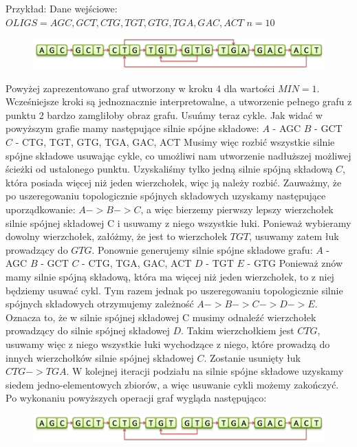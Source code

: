 \documentclass[a4paper,10pt]{article}
\begin{document}
Przykład:
Dane wejściowe:
$OLIGS = { AGC, GCT, CTG, TGT, GTG, TGA, GAC, ACT }$
$n = 10$

\begin{figure}[h]
  \footnotesize\centering
  \includegraphics[width=\textwidth,keepaspectratio]{Graph1.png}
\end{figure}

Powyżej zaprezentowano graf utworzony w kroku 4 dla wartości $MIN=1$. Wcześniejsze kroki są jednoznacznie interpretowalne, a utworzenie pełnego grafu z punktu 2 bardzo zamgliłoby obraz grafu. Usuńmy teraz cykle.
Jak widać w powyższym grafie mamy następujące silnie spójne składowe:
$A$ - {AGC}
$B$ - {GCT}
$C$ - {CTG, TGT, GTG, TGA, GAC, ACT}
Musimy więc rozbić wszystkie silnie spójne składowe usuwając cykle, co umożliwi nam utworzenie nadłuższej możliwej ścieżki od ustalonego punktu.
Uzyskaliśmy tylko jedną silnie spójną składową $C$, która posiada więcej niż jeden wierzchołek, więc ją należy rozbić. Zauważmy, że po uszeregowaniu topologicznie spójnych składowych uzyskamy następujące uporządkowanie: $A->B->C$, a więc bierzemy pierwszy lepszy wierzchołek silnie spójnej składowej C i usuwamy z niego wszystkie łuki. Ponieważ wybieramy dowolny wierzchołek, załóżmy, że jest to wierzchołek $TGT$, usuwamy zatem łuk prowadzący do $GTG$.
Ponownie generujemy silnie spójne składowe grafu:
$A$ - {AGC}
$B$ - {GCT}
$C$ - {CTG, TGA, GAC, ACT}
$D$ - {TGT}
$E$ - {GTG}
Ponieważ znów mamy silnie spójną składową, która ma więcej niż jeden wierzchołek, to z niej będziemy usuwać cykl. Tym razem jednak po uszeregowaniu topologicznie silnie spójnych składowych otrzymujemy zależność $A->B->C->D->E$. Oznacza to, że w silnie spójnej składowej C musimy odnaleźć wierzchołek prowadzący do silnie spójnej składowej $D$. Takim wierzchołkiem jest $CTG$, usuwamy więc z niego wszystkie łuki wychodzące z niego, które prowadzą do innych wierzchołków silnie spójnej składowej $C$. Zostanie usunięty łuk $CTG->TGA$.
W kolejnej iteracji podziału na silnie spójne składowe uzyskamy siedem jedno-elementowych zbiorów, a więc usuwanie cykli możemy zakończyć. Po wykonaniu powyższych operacji graf wygląda następująco:

\begin{figure}[h]
  \footnotesize\centering
  \includegraphics[width=\textwidth,keepaspectratio]{Graph2.png}
\end{figure}
\end{document}
